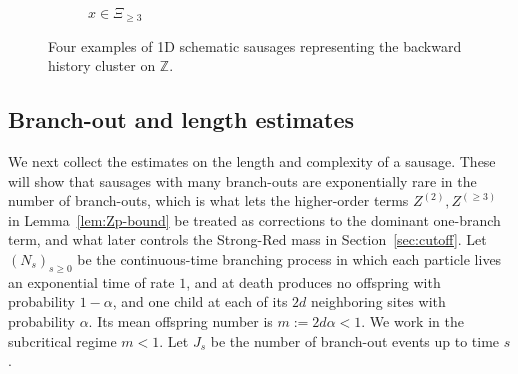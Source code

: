 \documentclass[letterpaper,11pt,reqno]{amsart}
\theoremstyle{definition}
\begin{document}
\begin{figure}[htbp]
\begin{subfigure}[b]{0.28\textwidth}
\caption{$x\in\Xi_{\geq 3}$}
\end{subfigure}

\caption{Four examples of 1D schematic sausages representing the backward history cluster on $\mathbb{Z}$.}
\label{fig:sausages_backward_shifted_labels}
\end{figure}


\subsection{Branch-out and length estimates}
\label{subsec:branch-length}

We next collect the estimates on the length and complexity of a sausage.
These will show that sausages with many branch-outs are exponentially rare in the number of branch-outs, which is
what lets the higher-order terms \(Z^{(2)},Z^{(\ge3)}\) in Lemma~\ref{lem:Zp-bound} be treated as
corrections to the dominant one-branch term, and what later controls the Strong-Red mass in
Section~\ref{sec:cutoff}. Let \((N_s)_{s\ge0}\)
be the continuous-time branching process in which each particle lives an exponential time of rate
\(1\), and at death produces no offspring with probability \(1-\alpha\), and one child at each of
its \(2d\) neighboring sites with probability \(\alpha\). Its mean offspring number is $m:=2d\alpha<1$.
We work in the subcritical regime \(m<1\). Let \(J_s\) be the number of branch-out events up to
time \(s\).
\end{document}
